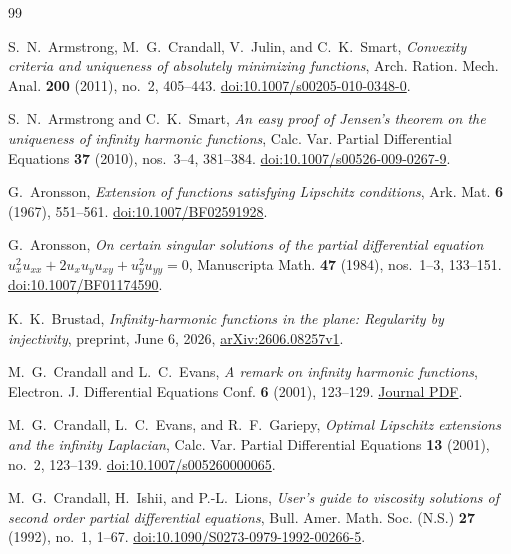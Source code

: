 \begin{thebibliography}{99}

S.~N.~Armstrong, M.~G.~Crandall, V.~Julin, and C.~K.~Smart,
\emph{Convexity criteria and uniqueness of absolutely minimizing functions},
Arch. Ration. Mech. Anal. \textbf{200} (2011), no.~2, 405--443.
\href{https://doi.org/10.1007/s00205-010-0348-0}{doi:10.1007/s00205-010-0348-0}.

S.~N.~Armstrong and C.~K.~Smart,
\emph{An easy proof of Jensen's theorem on the uniqueness of infinity harmonic functions},
Calc. Var. Partial Differential Equations \textbf{37} (2010), nos.~3--4, 381--384.
\href{https://doi.org/10.1007/s00526-009-0267-9}{doi:10.1007/s00526-009-0267-9}.

G.~Aronsson,
\emph{Extension of functions satisfying Lipschitz conditions},
Ark. Mat. \textbf{6} (1967), 551--561.
\href{https://doi.org/10.1007/BF02591928}{doi:10.1007/BF02591928}.

G.~Aronsson,
\emph{On certain singular solutions of the partial differential equation
  $u_x^2u_{xx}+2u_xu_yu_{xy}+u_y^2u_{yy}=0$},
Manuscripta Math. \textbf{47} (1984), nos.~1--3, 133--151.
\href{https://doi.org/10.1007/BF01174590}{doi:10.1007/BF01174590}.

K.~K.~Brustad,
\emph{Infinity-harmonic functions in the plane: Regularity by injectivity},
preprint, June 6, 2026,
\href{https://arxiv.org/abs/2606.08257v1}{arXiv:2606.08257v1}.

M.~G.~Crandall and L.~C.~Evans,
\emph{A remark on infinity harmonic functions},
Electron. J. Differential Equations Conf. \textbf{6} (2001), 123--129.
\href{https://ejde.math.txstate.edu/conf-proc/06/c6/crandall.pdf}{Journal PDF}.

M.~G.~Crandall, L.~C.~Evans, and R.~F.~Gariepy,
\emph{Optimal Lipschitz extensions and the infinity Laplacian},
Calc. Var. Partial Differential Equations \textbf{13} (2001), no.~2, 123--139.
\href{https://doi.org/10.1007/s005260000065}{doi:10.1007/s005260000065}.

M.~G.~Crandall, H.~Ishii, and P.-L.~Lions,
\emph{User's guide to viscosity solutions of second order partial differential equations},
Bull. Amer. Math. Soc. (N.S.) \textbf{27} (1992), no.~1, 1--67.
\href{https://doi.org/10.1090/S0273-0979-1992-00266-5}{doi:10.1090/S0273-0979-1992-00266-5}.


\end{thebibliography}

